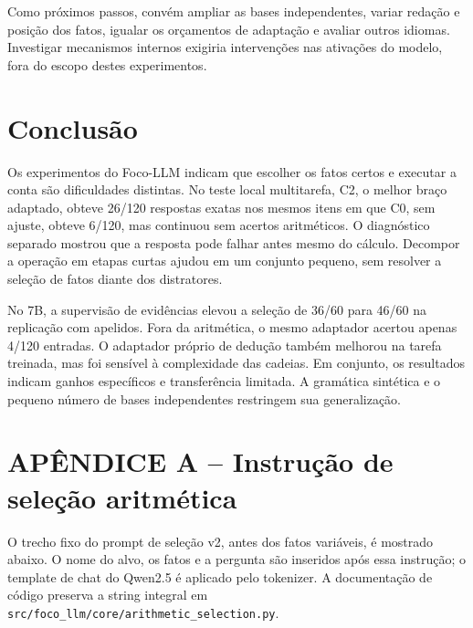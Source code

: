 \documentclass[12pt,a4paper]{article}
\begin{document}
Como próximos passos, convém ampliar as bases independentes, variar redação e posição dos fatos, igualar os orçamentos de adaptação e avaliar outros idiomas. Investigar mecanismos internos exigiria intervenções nas ativações do modelo, fora do escopo destes experimentos.

\section{Conclusão}
Os experimentos do Foco-LLM indicam que escolher os fatos certos e executar a conta são dificuldades distintas. No teste local multitarefa, C2, o melhor braço adaptado, obteve 26/120 respostas exatas nos mesmos itens em que C0, sem ajuste, obteve 6/120, mas continuou sem acertos aritméticos. O diagnóstico separado mostrou que a resposta pode falhar antes mesmo do cálculo. Decompor a operação em etapas curtas ajudou em um conjunto pequeno, sem resolver a seleção de fatos diante dos distratores.

No 7B, a supervisão de evidências elevou a seleção de 36/60 para 46/60 na replicação com apelidos. Fora da aritmética, o mesmo adaptador acertou apenas 4/120 entradas. O adaptador próprio de dedução também melhorou na tarefa treinada, mas foi sensível à complexidade das cadeias. Em conjunto, os resultados indicam ganhos específicos e transferência limitada. A gramática sintética e o pequeno número de bases independentes restringem sua generalização.

\section*{APÊNDICE A -- Instrução de seleção aritmética}
O trecho fixo do prompt de seleção v2, antes dos fatos variáveis, é mostrado abaixo. O nome do alvo, os fatos e a pergunta são inseridos após essa instrução; o template de chat do Qwen2.5 é aplicado pelo tokenizer. A documentação de código preserva a string integral em \texttt{src/foco\_llm/core/arithmetic\_selection.py}.
\end{document}
